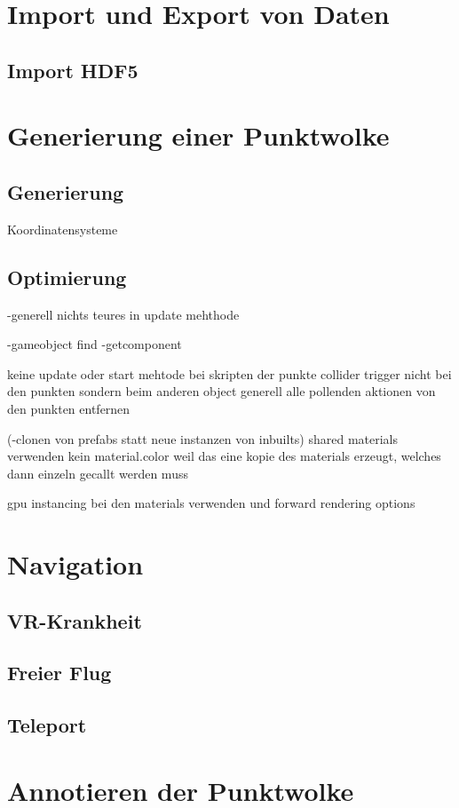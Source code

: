 \section{Import und Export von Daten}
\subsection{Import HDF5}

\section{Generierung einer Punktwolke}
\subsection{Generierung}
Koordinatensysteme

\subsection{Optimierung}
-generell nichts teures in update mehthode
	
-gameobject find
-getcomponent

keine update oder start mehtode bei skripten der punkte
collider trigger nicht bei den punkten sondern beim anderen object
generell alle pollenden aktionen von den punkten entfernen


(-clonen von prefabs statt neue instanzen von inbuilts)
shared materials verwenden   kein material.color weil das eine kopie des materials erzeugt, welches dann einzeln gecallt werden muss

gpu instancing bei den materials verwenden und forward rendering options

\section{Navigation}
\subsection{VR-Krankheit}
\subsection{Freier Flug}
\subsection{Teleport}

\section{Annotieren der Punktwolke}
